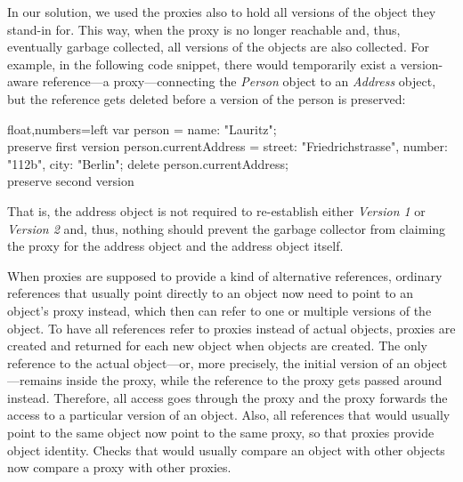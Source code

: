 
In our solution, we used the proxies also to hold all versions of the object they stand-in for.
This way, when the proxy is no longer reachable and, thus, eventually garbage collected, all versions of the objects are also collected.
For example, in the following code snippet, there would temporarily exist a version-aware reference---a proxy---connecting the \emph{Person} object to an \emph{Address} object, but the reference gets deleted before a version of the person is preserved:

\begin{code}{}{float,numbers=left}
    var person = {name: "Lauritz"};
    \\ preserve first version
    person.currentAddress = {street: "Friedrichstrasse",
                         number: "112b",
                         city: "Berlin"};
    delete person.currentAddress;
    \\ preserve second version
\end{code}
\iffalse
\end{verbatim}\fi

That is, the address object is not required to re-establish either \emph{Version 1} or \emph{Version 2} and, thus, nothing should prevent the garbage collector from claiming the proxy for the address object and the address object itself.








When proxies are supposed to provide a kind of alternative references, ordinary references that usually point directly to an object now need to point to an object's proxy instead, which then can refer to one or multiple versions of the object.
To have all references refer to proxies instead of actual objects, proxies are created and returned for each new object when objects are created.
The only reference to the actual object---or, more precisely, the initial version of an object---remains inside the proxy, while the reference to the proxy gets passed around instead.
Therefore, all access goes through the proxy and the proxy forwards the access to a particular version of an object.
Also, all references that would usually point to the same object now point to the same proxy, so that proxies provide object identity.
Checks that would usually compare an object with other objects now compare a proxy with other proxies.

